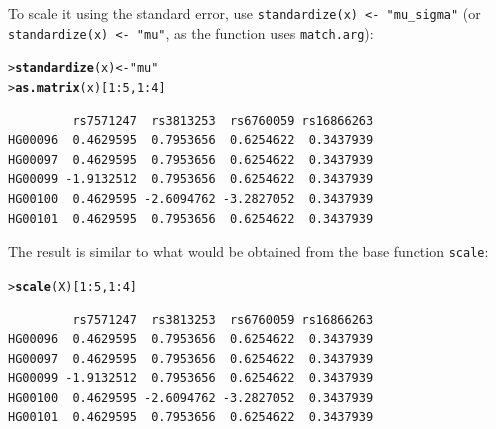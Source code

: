 \documentclass{article}\usepackage[]{graphicx}\usepackage[]{color}
\makeatletter
\newcommand{\hlnum}[1]{\textcolor[rgb]{0.686,0.059,0.569}{#1}}%
\newcommand{\hlstr}[1]{\textcolor[rgb]{0.192,0.494,0.8}{#1}}%
\newcommand{\hlopt}[1]{\textcolor[rgb]{0,0,0}{#1}}%
\newcommand{\hlstd}[1]{\textcolor[rgb]{0.345,0.345,0.345}{#1}}%
\newcommand{\hlkwb}[1]{\textcolor[rgb]{0.69,0.353,0.396}{#1}}%
\newcommand{\hlkwd}[1]{\textcolor[rgb]{0.737,0.353,0.396}{\textbf{#1}}}%
\newenvironment{kframe}{%
 \def\at@end@of@kframe{}%
 \ifinner\ifhmode%
  \def\at@end@of@kframe{\end{minipage}}%
  \begin{minipage}{\columnwidth}%
 \fi\fi%
 \def\FrameCommand##1{\hskip\@totalleftmargin \hskip-\fboxsep
 \colorbox{shadecolor}{##1}\hskip-\fboxsep
     \hskip-\linewidth \hskip-\@totalleftmargin \hskip\columnwidth}%
 \MakeFramed {\advance\hsize-\width
   \@totalleftmargin\z@ \linewidth\hsize
   \@setminipage}}%
 {\par\unskip\endMakeFramed%
 \at@end@of@kframe}
\newenvironment{knitrout}{}{} %
\makeatother
\begin{document}
  To scale it using the standard error, use \verb!standardize(x) <- "mu_sigma"! (or \verb!standardize(x) <- "mu"!,
  as the function uses \verb!match.arg!):
\begin{knitrout}
\color{fgcolor}\begin{kframe}
\begin{alltt}
\hlstd{> }\hlkwd{standardize}\hlstd{(x)} \hlkwb{<-} \hlstr{"mu"}
\hlstd{> }\hlkwd{as.matrix}\hlstd{(x)[}\hlnum{1}\hlopt{:}\hlnum{5}\hlstd{,} \hlnum{1}\hlopt{:}\hlnum{4}\hlstd{]}
\end{alltt}
\begin{verbatim}
         rs7571247  rs3813253  rs6760059 rs16866263
HG00096  0.4629595  0.7953656  0.6254622  0.3437939
HG00097  0.4629595  0.7953656  0.6254622  0.3437939
HG00099 -1.9132512  0.7953656  0.6254622  0.3437939
HG00100  0.4629595 -2.6094762 -3.2827052  0.3437939
HG00101  0.4629595  0.7953656  0.6254622  0.3437939
\end{verbatim}
\end{kframe}
\end{knitrout}

  The result is similar to what would be obtained from the base function \verb!scale!:
\begin{knitrout}
\color{fgcolor}\begin{kframe}
\begin{alltt}
\hlstd{> }\hlkwd{scale}\hlstd{(X)[}\hlnum{1}\hlopt{:}\hlnum{5}\hlstd{,}\hlnum{1}\hlopt{:}\hlnum{4}\hlstd{]}
\end{alltt}
\begin{verbatim}
         rs7571247  rs3813253  rs6760059 rs16866263
HG00096  0.4629595  0.7953656  0.6254622  0.3437939
HG00097  0.4629595  0.7953656  0.6254622  0.3437939
HG00099 -1.9132512  0.7953656  0.6254622  0.3437939
HG00100  0.4629595 -2.6094762 -3.2827052  0.3437939
HG00101  0.4629595  0.7953656  0.6254622  0.3437939
\end{verbatim}
\end{kframe}
\end{knitrout}
\end{document}
